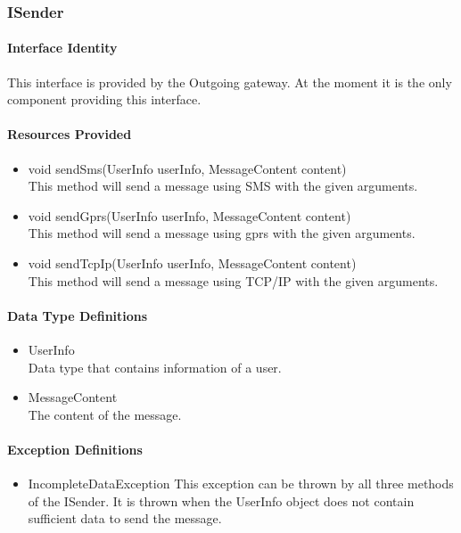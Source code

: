 \subsubsection{ISender}
\paragraph{Interface Identity}
This interface is provided by the Outgoing gateway. At the moment it
	is the only component providing this interface.
\paragraph{Resources Provided}
\begin{itemize}
	\item{void sendSms(UserInfo userInfo, MessageContent content)}\\
	This method will send a message using SMS with the given arguments.
	\item{void sendGprs(UserInfo userInfo, MessageContent content)}\\
	This method will send a message using gprs with the given arguments.
	\item{void sendTcpIp(UserInfo userInfo, MessageContent content)}\\
	This method will send a message using TCP/IP with the given arguments.
\end{itemize}
\paragraph{Data Type Definitions}
\begin{itemize}
	\item UserInfo\\
	Data type that contains information of a user.
	\item MessageContent\\
	The content of the message.
\end{itemize}
\paragraph{Exception Definitions}
\begin{itemize}
	\item IncompleteDataException
	This exception can be thrown by all three methods of the ISender. It is thrown
		when the UserInfo object does not contain sufficient data to send the message.
\end{itemize}